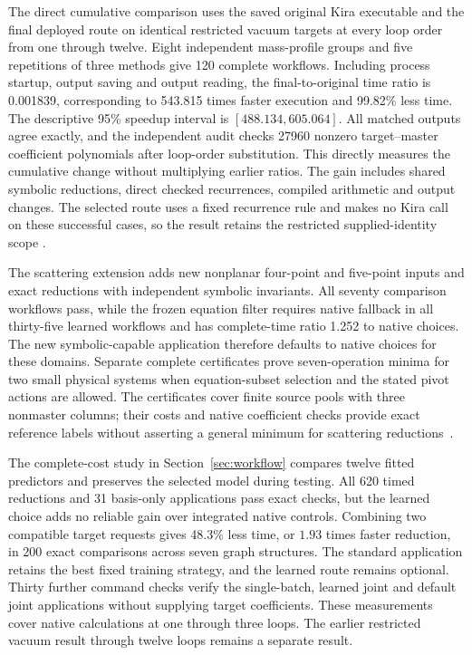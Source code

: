 \documentclass[11pt,a4paper]{article}
\begin{document}
The direct cumulative comparison uses the saved original Kira executable and the final deployed route on identical restricted vacuum targets at every loop order from one through twelve. Eight independent mass-profile groups and five repetitions of three methods give 120 complete workflows. Including process startup, output saving and output reading, the final-to-original time ratio is 0.001839, corresponding to 543.815 times faster execution and 99.82\% less time. The descriptive 95\% speedup interval is \([488.134,605.064]\). All matched outputs agree exactly, and the independent audit checks 27960 nonzero target--master coefficient polynomials after loop-order substitution. This directly measures the cumulative change without multiplying earlier ratios. The gain includes shared symbolic reductions, direct checked recurrences, compiled arithmetic and output changes. The selected route uses a fixed recurrence rule and makes no Kira call on these successful cases, so the result retains the restricted supplied-identity scope \cite{KiraCumulativeData}.

\noindent The scattering extension adds new nonplanar four-point and five-point inputs and exact reductions with independent symbolic invariants. All seventy comparison workflows pass, while the frozen equation filter requires native fallback in all thirty-five learned workflows and has complete-time ratio 1.252 to native choices. The new symbolic-capable application therefore defaults to native choices for these domains. Separate complete certificates prove seven-operation minima for two small physical systems when equation-subset selection and the stated pivot actions are allowed. The certificates cover finite source pools with three nonmaster columns; their costs and native coefficient checks provide exact reference labels without asserting a general minimum for scattering reductions~\cite{KiraGeneralizationData}.

The complete-cost study in Section~\ref{sec:workflow} compares twelve
fitted predictors and preserves the selected model during testing. All
620 timed reductions and 31 basis-only applications pass exact checks,
but the learned choice adds no reliable gain over integrated native
controls. Combining two compatible target requests gives 48.3\% less
time, or $1.93$ times faster reduction, in 200 exact comparisons across
seven graph structures. The standard application retains the best fixed
training strategy, and the learned route remains optional. Thirty further
command checks verify the single-batch, learned joint and default joint
applications without supplying target coefficients. These measurements
cover native calculations at one through three loops. The earlier
restricted vacuum result through twelve loops remains a separate result.
\end{document}
